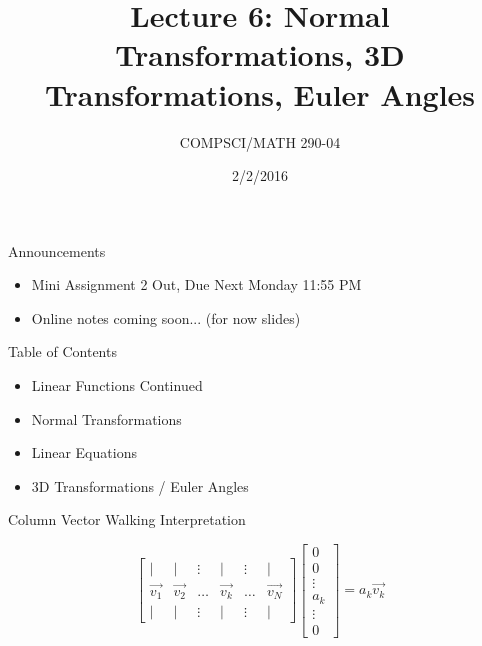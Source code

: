 \documentclass{beamer}
\title{Lecture 6: Normal Transformations, 3D Transformations, Euler Angles}
\date{2/2/2016}
\institute{Chris Tralie, Duke University}
\author{COMPSCI/MATH 290-04}
\begin{document}
\frame{\titlepage}

\begin{frame}{Announcements}

\begin{itemize}[label=$\blacktriangleright$]
    \item Mini Assignment 2 Out, Due Next Monday 11:55 PM
    \item Online notes coming soon... (for now slides)
\end{itemize}

\end{frame}

\begin{frame}{Table of Contents}

\begin{itemize}[label=$\blacktriangleright$]
	\item Linear Functions Continued
\end{itemize}
\begin{itemize}[label=$\vartriangleright$]
	\item Normal Transformations
	\item Linear Equations
    \item 3D Transformations / Euler Angles
\end{itemize}

\end{frame}



\begin{frame}{Column Vector Walking Interpretation}

\[
\left[ \begin{array}{cccccc} | & | & \vdots & | & \vdots & | \\ \vec{v_1} & \vec{v_2} & \hdots & \vec{v_k} & \hdots & \vec{v_N} \\ | & | & \vdots & | & \vdots & | \end{array}  \right] \left[ \begin{array}{c} 0 \\ 0 \\ \vdots \\ a_k \\ \vdots \\ 0 \end{array} \right] = a_k \vec{v_k}
\]

\end{frame}
\end{document}

